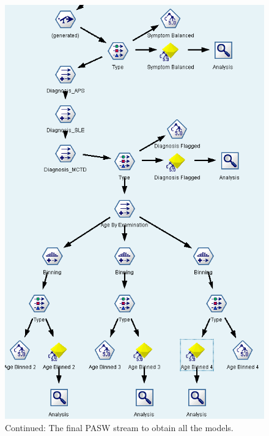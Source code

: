 \documentclass[12pt]{article}
\begin{document}
\begin{figure}[!ht]
\begin{center}
\includegraphics[width=.7\textwidth]{fig/pasw_stream_2.png}
\caption{Continued: The final PASW stream to obtain all the models.}
\label{fig:stream2}
\end{center}
\end{figure}
\end{document}
